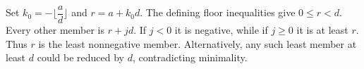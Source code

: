 Set $k_0=-\lfloor\dfrac{a}{d}\rfloor$ and $r=a+k_0d$. The defining floor inequalities give $0\le r<d$. Every other member is $r+jd$. If $j<0$ it is negative, while if $j\ge0$ it is at least $r$. Thus $r$ is the least nonnegative member. Alternatively, any such least member at least $d$ could be reduced by $d$, contradicting minimality.
